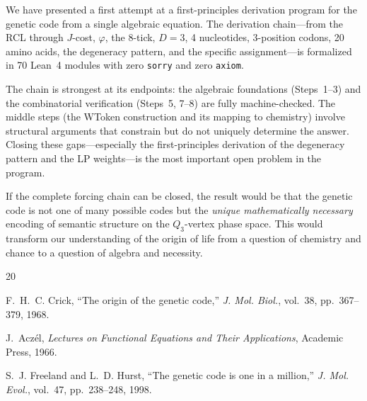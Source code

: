 \documentclass[11pt,twocolumn]{article}
\newcommand{\vp}{\varphi}
\begin{document}
We have presented a first attempt at a first-principles derivation program
for the genetic code from a single algebraic equation. The
derivation chain---from the RCL through $J$-cost, $\vp$, the 8-tick,
$D=3$, 4 nucleotides, 3-position codons, 20 amino acids, the degeneracy
pattern, and the specific assignment---is formalized in 70 Lean~4
modules with zero \texttt{sorry} and zero \texttt{axiom}.

The chain is strongest at its endpoints: the algebraic foundations
(Steps~1--3) and the combinatorial verification (Steps~5, 7--8) are
fully machine-checked. The middle steps (the WToken construction and
its mapping to chemistry) involve structural arguments that constrain
but do not uniquely determine the answer. Closing these gaps---especially
the first-principles derivation of the degeneracy pattern and the
LP weights---is the most important open problem in the program.

If the complete forcing chain can be closed, the result would be that
the genetic code is not one of many possible codes but the \emph{unique
mathematically necessary} encoding of semantic structure on the
$Q_3$-vertex phase space. This would transform our understanding of the
origin of life from a question of chemistry and chance to a question of
algebra and necessity.

\begin{thebibliography}{20}

F.~H.~C. Crick,
``The origin of the genetic code,''
\emph{J. Mol. Biol.}, vol.~38, pp.~367--379, 1968.

J.~Acz\'el,
\emph{Lectures on Functional Equations and Their Applications},
Academic Press, 1966.

S.~J. Freeland and L.~D. Hurst,
``The genetic code is one in a million,''
\emph{J. Mol. Evol.}, vol.~47, pp.~238--248, 1998.

\end{thebibliography}
\end{document}
